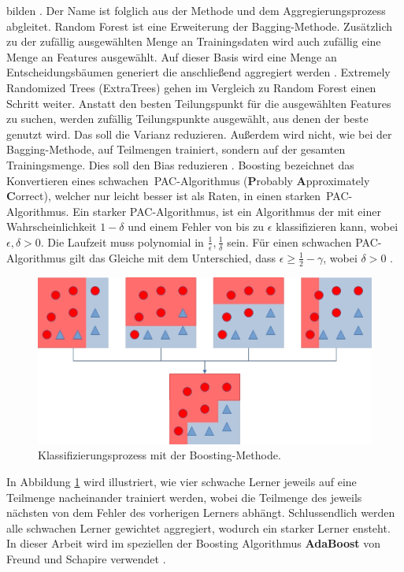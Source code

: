bilden \cite{efron1992bootstrap}. Der Name ist folglich aus der Methode und dem Aggregierungsprozess abgleitet.
\newline
\newline
Random Forest ist eine Erweiterung der Bagging-Methode. Zusätzlich zu der zufällig ausgewählten Menge an Trainingsdaten wird auch zufällig eine Menge an Features ausgewählt. Auf dieser Basis wird eine Menge an
Entscheidungsbäumen generiert die anschließend aggregiert werden \cite{breiman2001random}.
\newline
\newline
Extremely Randomized Trees (ExtraTrees) gehen im Vergleich zu Random Forest einen Schritt weiter. Anstatt den besten Teilungspunkt für die ausgewählten Features zu suchen, werden zufällig Teilungspunkte ausgewählt, aus denen
der beste genutzt wird. Das soll die Varianz reduzieren. Außerdem wird nicht, wie bei der Bagging-Methode, auf Teilmengen trainiert, sondern auf der gesamten Trainingsmenge. Dies soll den Bias reduzieren \cite{geurts2006extremely}.
\newline
\newline
Boosting bezeichnet das Konvertieren eines \glqq schwachen\grqq\ PAC-Algorithmus (\textbf{P}robably \textbf{A}pproximately \textbf{C}orrect), welcher nur leicht besser ist als Raten, in einen \glqq starken\grqq\
PAC-Algorithmus. Ein starker PAC-Algorithmus, ist ein Algorithmus der mit einer Wahrscheinlichkeit $1 - \delta$ und einem Fehler von bis zu $\epsilon$ klassifizieren kann, wobei $\epsilon, \delta > 0$. Die
Laufzeit muss polynomial in $\frac{1}{\epsilon}, \frac{1}{\delta}$ sein. Für einen schwachen PAC-Algorithmus gilt das Gleiche mit dem Unterschied, dass $\epsilon \geq \frac{1}{2} - \gamma$, wobei $\delta > 0$ \cite{freund1997decision}.
\begin{figure}
    \centering
    \includegraphics[width=\linewidth]{images/boosting.jpg}
    \caption{Klassifizierungsprozess mit der Boosting-Methode.}
    \label{fig:boosting}
\end{figure}
In Abbildung \ref{fig:boosting} wird illustriert, wie vier schwache Lerner jeweils auf eine Teilmenge nacheinander trainiert werden, wobei die Teilmenge des jeweils nächsten von dem Fehler des vorherigen Lerners
abhängt. Schlussendlich werden alle schwachen Lerner gewichtet aggregiert, wodurch ein starker Lerner ensteht. In dieser Arbeit wird im speziellen der Boosting Algorithmus \textbf{AdaBoost} von Freund
und Schapire verwendet \cite{freund1997decision}.